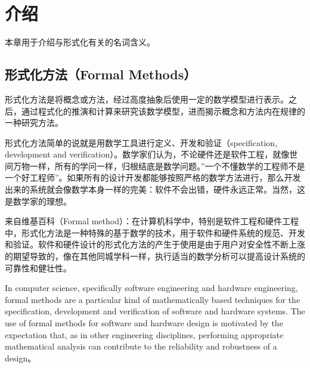 \documentclass[cs4size,a4pape,UTF8]{ctexart}
\numberwithin{equation}{section}
\numberwithin{table}{section}
\numberwithin{figure}{section}
\begin{document}
\newtheorem{example}{例}              %
\newtheorem{algorithm}{算法}
\newtheorem{theorem}{定理}            %
\newtheorem{definition}{定义}
\newtheorem{axiom}{公理}
\newtheorem{property}{性质}
\newtheorem{proposition}{命题}
\newtheorem{lemma}{引理}
\newtheorem{corollary}{推论}
\newtheorem{remark}{注解}
\newtheorem{condition}{条件}
\newtheorem{conclusion}{结论}
\newtheorem{assumption}{假设}
\renewcommand{\contentsname}{目录}     
\renewcommand{\abstractname}{摘要} 
\renewcommand{\refname}{参考文献}     
\renewcommand{\indexname}{索引}
\renewcommand{\figurename}{图}
\renewcommand{\tablename}{表}
\renewcommand{\appendixname}{附录}
\renewcommand{\proofname}{证明}
\renewcommand{\algorithm}{算法} 

\pagestyle{plain}

\pagestyle{empty}
\tableofcontents 
\thispagestyle{empty}
\pagestyle{fancy}
\newpage
{}%
\section{介绍}
 本章用于介绍与形式化有关的名词含义。
 
\subsection{形式化方法（Formal Methods）}
形式化方法是将概念或方法，经过高度抽象后使用一定的数学模型进行表示。之后，通过程式化的推演和计算来研究该数学模型，进而揭示概念和方法内在规律的一种研究方法。

形式化方法简单的说就是用数学工具进行定义、开发和验证（specification, development and verification）。数学家们认为，不论硬件还是软件工程，就像世间万物一样，所有的学问一样，归根结底是数学问题。''一个不懂数学的工程师不是一个好工程师''。如果所有的设计开发都能够按照严格的数学方法进行，那么开发出来的系统就会像数学本身一样的完美：软件不会出错，硬件永远正常。当然，这是数学家的理想。

来自维基百科（Formal method）：在计算机科学中，特别是软件工程和硬件工程中，形式化方法是一种特殊的基于数学的技术，用于软件和硬件系统的规范、开发和验证。软件和硬件设计的形式化方法的产生于使用是由于用户对安全性不断上涨的期望导致的，像在其他同城学科一样，执行适当的数学分析可以提高设计系统的可靠性和健壮性。

In computer science, specifically software engineering and hardware engineering, formal methods are a particular kind of mathematically based techniques for the specification, development and verification of software and hardware systems. The use of formal methods for software and hardware design is motivated by the expectation that, as in other engineering disciplines, performing appropriate mathematical analysis can contribute to the reliability and robustness of a design。
\end{document}
